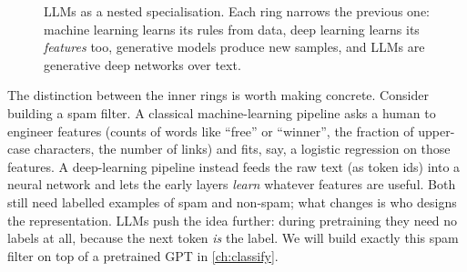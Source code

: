 \begin{figure}[t]
\centering
{}
\caption{LLMs as a nested specialisation. Each ring narrows the previous one: machine learning learns its
rules from data, deep learning learns its \emph{features} too, generative models produce new samples,
and LLMs are generative deep networks over text.}
\label{fig:landscape:fields}
\end{figure}

The distinction between the inner rings is worth making concrete. Consider building a spam filter.
A classical machine-learning pipeline asks a human to engineer features (counts of words like ``free''
or ``winner'', the fraction of upper-case characters, the number of links) and fits, say, a logistic
regression on those features. A deep-learning pipeline instead feeds the raw text (as token ids) into a
neural network and lets the early layers \emph{learn} whatever features are useful. Both still need
labelled examples of spam and non-spam; what changes is who designs the representation. LLMs push the
idea further: during pretraining they need no labels at all, because the next token \emph{is} the
label. We will build exactly this spam filter on top of a pretrained GPT in \cref{ch:classify}.

